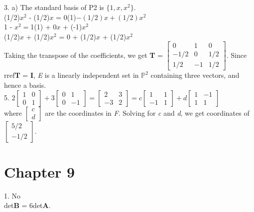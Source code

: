 \documentclass{article}
\begin{document}
    3. a) The standard basis of P2 is $\{ 1, x, x^2\}$. \\
    (1/2)$x^2$ - (1/2)$x$ = 0(1)$ - (1/2)x + (1/2)x^2$ \\
    1 - $x^2 = $1(1) + 0$x$ + (-1)$x^2$ \\
    (1/2)$x$ + (1/2)$x^2$ = 0 + (1/2)$x$ + (1/2)$x^2$ \\
    Taking the transpose of the coefficients, we get \textbf{T} = $\begin{bmatrix} 0 & 1 & 0\\ -1/2 & 0 & 1/2\\ 1/2 & -1 & 1/2\end{bmatrix}.$ Since rref\textbf{T} = \textbf{I}, \textit{E} is a linearly independent set in $\mathbb{P}^{2}$ containing three vectors, and hence a basis.\\

    5. $2\begin{bmatrix} 1 & 0\\ 0 & 1\end{bmatrix} + 3\begin{bmatrix} 0 & 1\\ 0 & -1\end{bmatrix} = \begin{bmatrix} 2 & 3\\ -3 & 2\end{bmatrix} = \textit{c}\begin{bmatrix} 1 & 1\\ -1 & 1\end{bmatrix} + \textit{d}\begin{bmatrix} 1 & -1 \\ 1 & 1\end{bmatrix}$ \\
    where $\begin{bmatrix} \textit{c}\\ \textit{d}\end{bmatrix}$ are the coordinates in \textit{F}. Solving for \textit{c} and \textit{d}, we get coordinates of $\begin{bmatrix} 5/2\\ -1/2\end{bmatrix}$.
    \section*{Chapter 9}
    \setlength{\parindent}{0pt}
    1. No\\
    det\textbf{B} = 6det\textbf{A}.\\
\end{document}
